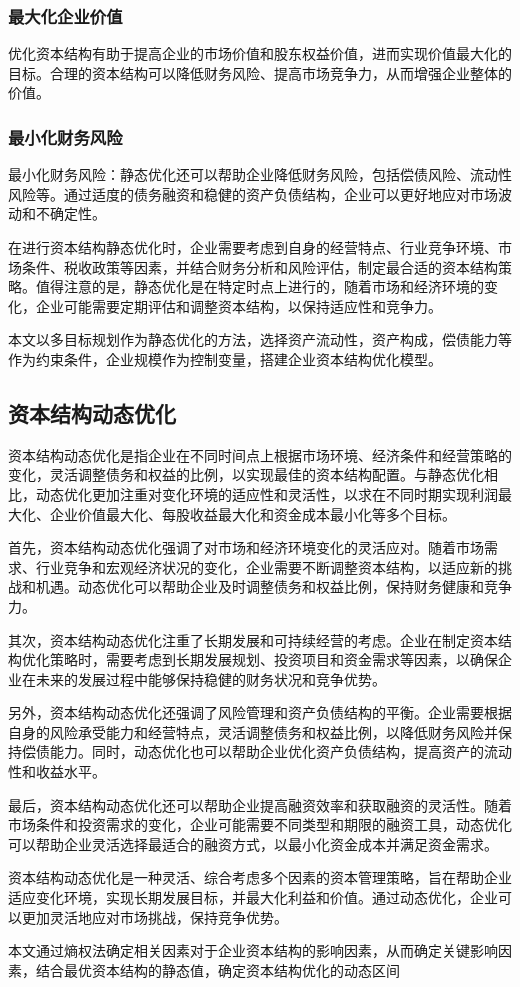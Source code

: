 \subsubsection{最大化企业价值}
优化资本结构有助于提高企业的市场价值和股东权益价值，进而实现价值最大化的目标。合理的资本结构可以降低财务风险、提高市场竞争力，从而增强企业整体的价值。
\subsubsection{最小化财务风险}
最小化财务风险：静态优化还可以帮助企业降低财务风险，包括偿债风险、流动性风险等。通过适度的债务融资和稳健的资产负债结构，企业可以更好地应对市场波动和不确定性。

在进行资本结构静态优化时，企业需要考虑到自身的经营特点、行业竞争环境、市场条件、税收政策等因素，并结合财务分析和风险评估，制定最合适的资本结构策略。值得注意的是，静态优化是在特定时点上进行的，随着市场和经济环境的变化，企业可能需要定期评估和调整资本结构，以保持适应性和竞争力。

本文以多目标规划作为静态优化的方法，选择资产流动性，资产构成，偿债能力等作为约束条件，企业规模作为控制变量，搭建企业资本结构优化模型。 

\subsection{资本结构动态优化}
资本结构动态优化是指企业在不同时间点上根据市场环境、经济条件和经营策略的变化，灵活调整债务和权益的比例，以实现最佳的资本结构配置。与静态优化相比，动态优化更加注重对变化环境的适应性和灵活性，以求在不同时期实现利润最大化、企业价值最大化、每股收益最大化和资金成本最小化等多个目标。

首先，资本结构动态优化强调了对市场和经济环境变化的灵活应对。随着市场需求、行业竞争和宏观经济状况的变化，企业需要不断调整资本结构，以适应新的挑战和机遇。动态优化可以帮助企业及时调整债务和权益比例，保持财务健康和竞争力。

其次，资本结构动态优化注重了长期发展和可持续经营的考虑。企业在制定资本结构优化策略时，需要考虑到长期发展规划、投资项目和资金需求等因素，以确保企业在未来的发展过程中能够保持稳健的财务状况和竞争优势。

另外，资本结构动态优化还强调了风险管理和资产负债结构的平衡。企业需要根据自身的风险承受能力和经营特点，灵活调整债务和权益比例，以降低财务风险并保持偿债能力。同时，动态优化也可以帮助企业优化资产负债结构，提高资产的流动性和收益水平。

最后，资本结构动态优化还可以帮助企业提高融资效率和获取融资的灵活性。随着市场条件和投资需求的变化，企业可能需要不同类型和期限的融资工具，动态优化可以帮助企业灵活选择最适合的融资方式，以最小化资金成本并满足资金需求。

资本结构动态优化是一种灵活、综合考虑多个因素的资本管理策略，旨在帮助企业适应变化环境，实现长期发展目标，并最大化利益和价值。通过动态优化，企业可以更加灵活地应对市场挑战，保持竞争优势。

本文通过熵权法确定相关因素对于企业资本结构的影响因素，从而确定关键影响因素，结合最优资本结构的静态值，确定资本结构优化的动态区间   